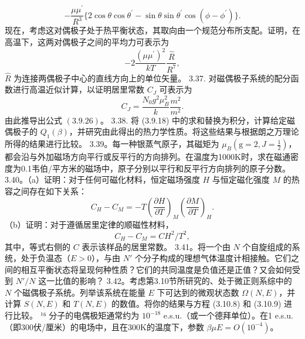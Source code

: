 \begin{equation}\tag{3.5.146}\label{eq:3.5.146}
- \frac { \mu \mu ^{\prime} } { R ^{3} } \{ 2 \cos \theta \cos \theta ^{\prime} - \sin \theta \sin \theta ^{\prime} \cos ( \phi - \phi ^{\prime} ) \} .
\end{equation}
现在，考虑这对偶极子处于热平衡状态，其取向由一个规范分布所支配。证明，在高温下，这两对偶极子之间的平均力可表示为
\begin{equation}\tag{3.5.147}\label{eq:3.5.147}
- 2 \frac { ( \mu \mu ^{\prime} ) ^{2} } { k T } \frac { \hat { R } } { R ^{7} } ,
\end{equation}
\(\hat{R}\) 为连接两偶极子中心的直线方向上的单位矢量。
3.37. 对磁偶极子系统的配分函数进行高温近似计算，以证明居里常数 \(C_J\) 可表示为
\begin{equation}\tag{3.5.148}\label{eq:3.5.148}
C _ { J } = \frac { N _ { 0 } g ^{2} \mu _ { B } ^{2} } { k } \frac { m ^{2} } { m ^{2} } .
\end{equation}
由此推导出公式 \((3.9.26)\)。
3.38. 将 (3.9.18) 中的求和替换为积分，计算给定磁偶极子的 \(Q_{1}(\beta)\)，并研究由此得出的热力学性质。将这些结果与根据朗之万理论所得的结果进行比较。
3.39。每一种银蒸气原子，其磁矩为 \(\mu_{B}(\mathrm{g}=2, J=\frac{1}{2})\)，都会沿与外加磁场方向平行或反平行的方向排列。在温度为1000K时，求在磁通密度为0.1韦伯/平方米的磁场中，原子分别以平行和反平行方向排列的原子分数。
3.40。（a）证明：对于任何可磁化材料，恒定磁场强度 \(H\) 与恒定磁化强度 \(M\) 的热容之间存在如下关系：
\begin{equation}\tag{3.5.149}\label{eq:3.5.149}
C _ { H } - C _ { M } = - T \left( \frac { \partial H } { \partial T } \right) _ { M } \left( \frac { \partial M } { \partial T } \right) _ { H } .
\end{equation}
（b）证明：对于遵循居里定律的顺磁性材料，
\begin{equation}\tag{3.5.150}\label{eq:3.5.150}
C _ { H } - C _ { M } = C H ^{2} / T ^{2} ,
\end{equation}
其中，等式右侧的 \(C\) 表示该样品的居里常数。
3.41。将一个由 \(N\) 个自旋组成的系统，处于负温态（\(E > 0\)），与由 \(N'\) 个分子构成的理想气体温度计相接触。它们之间的相互平衡状态将呈现何种性质？它们的共同温度是负值还是正值？又会如何受到 \(N'/N\) 这一比值的影响？
3.42。考虑第3.10节所研究的、处于微正则系综中的 \(N\) 个磁偶极子系统。列举该系统在能量 \(E\) 下可达到的微观状态数 \(\Omega(N,E)\)，并计算 \(S(N,E)\) 和 \(T(N,E)\) 的数值。将你的结果与方程 (3.10.8) 和 (3.10.9) 进行比较。
¹⁶ 分子的电偶极矩通常约为 \(10^{-18}\) e.s.u.（或一个德拜单位）。在1 e.s.u.（即300伏/厘米）的电场中，且在300K的温度下，参数 \(\beta\mu E = O(10^{-4})\)。
